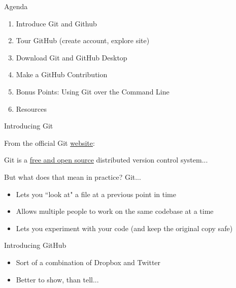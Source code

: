 \documentclass{beamer}
\begin{document}
\begin{frame}{Agenda}
	\begin{enumerate}
		\item Introduce Git and Github
		\item Tour GitHub (create account, explore site)
		\item Download Git and GitHub Desktop
		\item Make a GitHub Contribution
		\item Bonus Points: Using Git over the Command Line
		\item Resources
	\end{enumerate}

\end{frame}


\begin{frame}{Introducing Git}

	From the official Git \href{https://git-scm.com}{website}: \newline

	\begin{displayquote}
		Git is a \href{https://git-scm.com/about/free-and-open-source}{free and open source} distributed version control system...
	\end{displayquote}

	But what does that mean in practice? Git...

	\begin{itemize}
		\item Lets you ``look at" a file at a previous point in time
		\item Allows multiple people to work on the same codebase at a time
		\item Lets you experiment with your code (and keep the original copy safe)
	\end{itemize}

\end{frame}


\begin{frame}{Introducing GitHub}
	\begin{itemize}
		\item Sort of a combination of Dropbox and Twitter
		\item Better to show, than tell...
	\end{itemize}

\end{frame}
\end{document}
